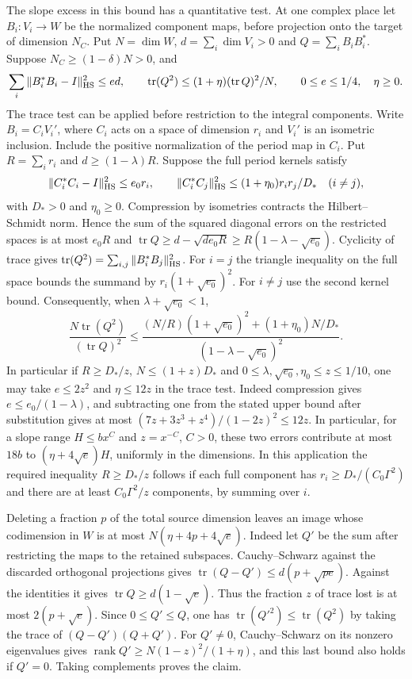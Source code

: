 \documentclass[11pt]{amsart}
\theoremstyle{definition}
\theoremstyle{remark}
\begin{document}
The slope excess in this bound has a quantitative test. At one
complex place let $B_i:V_i\to W$ be the normalized component maps,
before projection onto the target of dimension $N_C$. Put
$N=\dim W$, $d=\sum_i\dim V_i>0$ and $Q=\sum_iB_iB_i^*$.
Suppose $N_C\ge(1-\delta)N>0$, and
\[
 \sum_i\|B_i^*B_i-I\|_{\rm HS}^2\le ed,\qquad
 \operatorname{tr}(Q^2)\le(1+\eta)(\operatorname{tr}Q)^2/N,
 \qquad 0\le e\le1/4,\quad \eta\ge0 .
\]
The trace test can be applied before restriction to the integral
components. Write $B_i=C_iV_i'$, where $C_i$ acts on a space of
dimension $r_i$ and $V_i'$ is an isometric inclusion. Include the
positive normalization of the period map in $C_i$. Put $R=\sum_i r_i$
and $d\ge(1-\lambda)R$. Suppose the full period kernels satisfy
\[
 \|C_i^*C_i-I\|_{\rm HS}^2\le e_0r_i,\qquad
 \|C_i^*C_j\|_{\rm HS}^2\le(1+\eta_0)r_ir_j/D_*
 \quad(i\ne j),
\]
with $D_*>0$ and $\eta_0\ge0$. Compression by isometries contracts
the Hilbert--Schmidt norm. Hence the sum of the squared diagonal
errors on the restricted spaces is at most $e_0R$ and
$\operatorname{tr}Q\ge d-\sqrt{de_0R}\ge
R(1-\lambda-\sqrt{e_0})$. Cyclicity of trace gives
$\operatorname{tr}(Q^2)=\sum_{i,j}\|B_i^*B_j\|_{\rm HS}^2$.
For $i=j$ the triangle inequality on the full space bounds the
summand by $r_i(1+\sqrt{e_0})^2$. For $i\ne j$ use the second
kernel bound. Consequently, when $\lambda+\sqrt{e_0}<1$,
\[
 \frac{N\operatorname{tr}(Q^2)}{(\operatorname{tr}Q)^2}
 \le \frac{(N/R)(1+\sqrt{e_0})^2+(1+\eta_0)N/D_*}
          {(1-\lambda-\sqrt{e_0})^2}.
\]
In particular if $R\ge D_*/z$, $N\le(1+z)D_*$ and
$0\le\lambda,\sqrt{e_0},\eta_0\le z\le1/10$, one may take $e\le2z^2$ and $\eta\le12z$ in the trace test.
Indeed compression gives $e\le e_0/(1-\lambda)$, and subtracting
one from the stated upper bound after substitution gives at most
$(7z+3z^3+z^4)/(1-2z)^2\le12z$. In particular, for a slope
range $H\le bx^C$ and $z=x^{-C}$, $C>0$, these two errors
contribute at most $18b$ to $(\eta+4\sqrt e)H$, uniformly in the
dimensions. In this application the required inequality
$R\ge D_*/z$ follows if each full component has
$r_i\ge D_*/(C_0\Gamma^2)$ and there are at least
$C_0\Gamma^2/z$ components, by summing over $i$.

Deleting a fraction $p$ of the total source dimension leaves an image
whose codimension in $W$ is at most $N(\eta+4p+4\sqrt e)$.
Indeed let $Q'$ be the sum after restricting the maps to the retained
subspaces. Cauchy--Schwarz against the discarded orthogonal
projections gives $\operatorname{tr}(Q-Q')\le d(p+\sqrt{pe})$.
Against the identities it gives $\operatorname{tr}Q\ge d(1-\sqrt e)$.
Thus the fraction $z$ of trace lost is at most $2(p+\sqrt e)$.
Since $0\le Q'\le Q$, one has
$\operatorname{tr}(Q'^2)\le\operatorname{tr}(Q^2)$ by taking
the trace of $(Q-Q')(Q+Q')$. For $Q'\ne0$, Cauchy--Schwarz on
its nonzero eigenvalues gives
$\operatorname{rank}Q'\ge N(1-z)^2/(1+\eta)$, and this last
bound also holds if $Q'=0$. Taking complements proves the claim.
\end{document}
